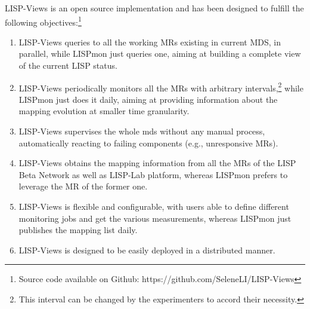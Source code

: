 LISP-Views is an open source implementation and has been designed to fulfill the following objectives:\footnote{Source code available on Github: https://github.com/SeleneLI/LISP-Views}

\begin{enumerate}[noitemsep,topsep=0pt]
  \item LISP-Views queries to all the working MRs existing in current MDS, in
parallel, while LISPmon just queries one, aiming at building a complete view of
the current LISP status.
  \item LISP-Views periodically monitors all the MRs with arbitrary
  intervals,\footnote{This interval can be changed by the experimenters to accord
  their necessity.} %
  while LISPmon just does it daily, aiming
  at providing information about the mapping evolution at smaller time granularity.
  \item LISP-Views supervises the whole \acrshort{mds} without any manual process,
automatically reacting to failing components (e.g., unresponsive MRs).
  \item LISP-Views obtains the mapping information from all the MRs of the LISP
Beta Network as well as LISP-Lab platform, whereas LISPmon prefers to leverage the
MR of the former one.
  \item LISP-Views is flexible and configurable, with users able to define
different monitoring jobs and get the various measurements, whereas LISPmon
just publishes the mapping list daily.
  \item LISP-Views is designed to be easily deployed in a distributed manner. %
\end{enumerate}


